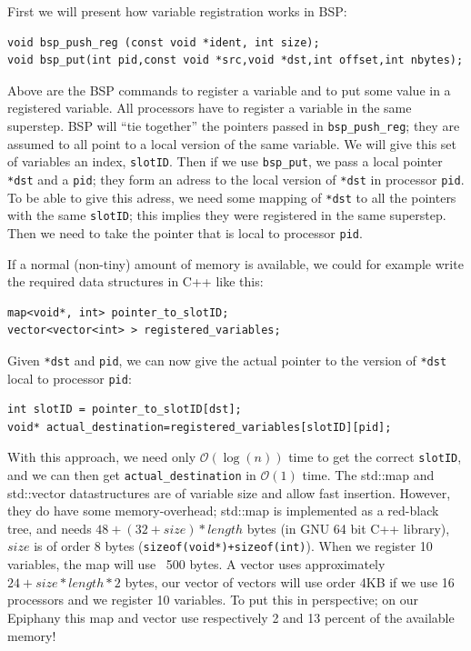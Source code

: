 \documentclass[fleqn]{article}
\renewcommand{\(}{\left(}
\renewcommand{\)}{\right)}
\begin{document}
First we will present how variable registration works in BSP:
\begin{lstlisting}
void bsp_push_reg (const void *ident, int size);
void bsp_put(int pid,const void *src,void *dst,int offset,int nbytes);
\end{lstlisting}
Above are the BSP commands to register a variable and to put some value in a registered variable.
All processors have to register a variable in the same superstep. BSP will ``tie together'' the pointers passed in \texttt{bsp\_push\_reg}; they are assumed to all point to a local version of the same variable. We will give this set of variables an index, \texttt{slotID}. Then if we use \texttt{bsp\_put}, we pass a local pointer \texttt{*dst} and a \texttt{\texttt{pid}}; they form an adress to the local version of \texttt{*dst} in processor \texttt{pid}. To be able to give this adress, we need some mapping of \texttt{*dst} to all the pointers with the same \texttt{slotID}; this implies they were registered in the same superstep. Then we need to take the pointer that is local to processor \texttt{pid}.

If a normal (non-tiny) amount of memory is available, we could for example write the required data structures in C++ like this:
\begin{lstlisting}
map<void*, int> pointer_to_slotID;
vector<vector<int> > registered_variables;
\end{lstlisting}
Given \texttt{*dst} and \texttt{pid}, we can now give the actual pointer to the version of \texttt{*dst} local to processor \texttt{pid}:
\begin{lstlisting}
int slotID = pointer_to_slotID[dst];
void* actual_destination=registered_variables[slotID][pid];
\end{lstlisting}
With this approach, we need only $\mathcal{O}(\log(n))$ time to get the correct \texttt{slotID}, and we can then get \texttt{actual\_destination} in $\mathcal{O}(1)$ time. The std::map and std::vector datastructures are of variable size and allow fast insertion. However, they do have some memory-overhead; std::map is implemented as a red-black tree, and needs $48+(32+size)*length$ bytes (in GNU 64 bit C++ library), $size$ is of order 8 bytes (\texttt{sizeof(void*)+sizeof(int)}). When we register 10 variables, the map will use ~500 bytes. A vector uses approximately $24+size*length*2$ bytes, our vector of vectors will use order 4KB if we use 16 processors and we register 10 variables. To put this in perspective; on our Epiphany this map and vector use respectively 2 and 13 percent of the available memory!
\end{document}

